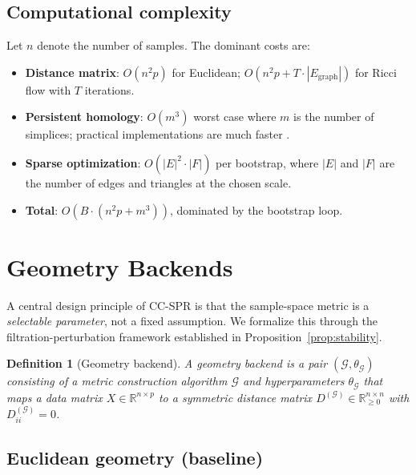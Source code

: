 \documentclass[11pt]{article}
\newtheorem{definition}[theorem]{Definition}
\begin{document}
\subsection{Computational complexity}

Let $n$ denote the number of samples.
The dominant costs are:
\begin{itemize}[leftmargin=1.5em]
\item \textbf{Distance matrix}: $O(n^2 p)$ for Euclidean; $O(n^2 p + T \cdot |E_{\text{graph}}|)$ for Ricci flow with $T$ iterations.
\item \textbf{Persistent homology}: $O(m^3)$ worst case where $m$ is the number of simplices; practical implementations are much faster \cite{gudhi2014}.
\item \textbf{Sparse optimization}: $O(|E|^2 \cdot |F|)$ per bootstrap, where $|E|$ and $|F|$ are the number of edges and triangles at the chosen scale.
\item \textbf{Total}: $O(B \cdot (n^2 p + m^3))$, dominated by the bootstrap loop.
\end{itemize}

\section{Geometry Backends}
\label{sec:backends}

A central design principle of CC-SPR is that the sample-space metric is a \emph{selectable parameter}, not a fixed assumption.
We formalize this through the filtration-perturbation framework established in Proposition~\ref{prop:stability}.

\begin{definition}[Geometry backend]\label{def:backend}
A \emph{geometry backend} is a pair $(\mathcal{G}, \theta_{\mathcal{G}})$ consisting of a metric construction algorithm $\mathcal{G}$ and hyperparameters $\theta_{\mathcal{G}}$ that maps a data matrix $X \in \mathbb{R}^{n \times p}$ to a symmetric distance matrix $D^{(\mathcal{G})} \in \mathbb{R}_{\ge 0}^{n \times n}$ with $D^{(\mathcal{G})}_{ii} = 0$.
\end{definition}

\subsection{Euclidean geometry (baseline)}
\end{document}
